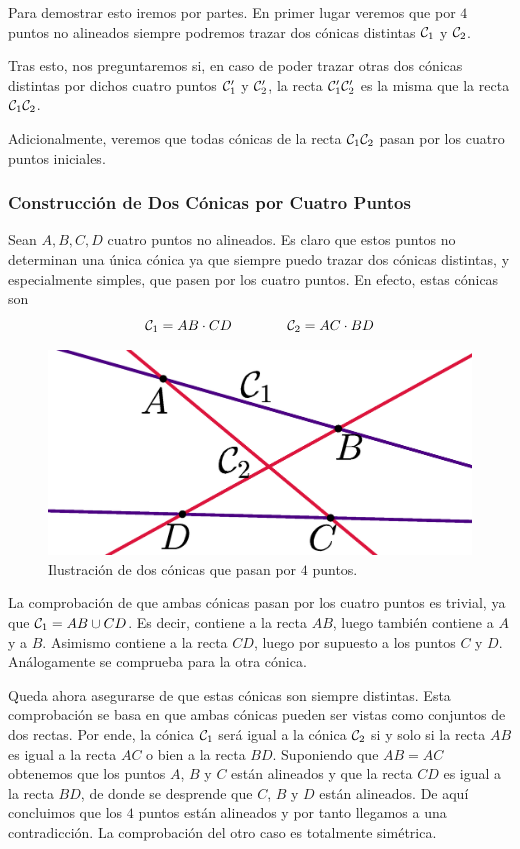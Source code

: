 Para demostrar esto iremos por partes. En primer lugar veremos que por $4$ puntos no alineados siempre podremos trazar dos cónicas distintas $\mathcal{C}_1$ y $\mathcal{C}_2$.

Tras esto, nos preguntaremos si, en caso de poder trazar otras dos cónicas distintas por dichos cuatro puntos $\mathcal{C}_1'$ y $\mathcal{C}_2'$, la recta $\mathcal{C}_1'\mathcal{C}_2'$ es la misma que la recta $\mathcal{C}_1\mathcal{C}_2$.

Adicionalmente, veremos que todas cónicas de la recta $\mathcal{C}_1\mathcal{C}_2$ pasan por los cuatro puntos iniciales.
\subsubsection{Construcción de Dos Cónicas por Cuatro Puntos}
Sean $A,B,C,D$ cuatro puntos no alineados. Es claro que estos puntos no determinan una única cónica ya que siempre puedo trazar dos cónicas distintas, y especialmente simples, que pasen por los cuatro puntos. En efecto, estas cónicas son
\begin{equation}
	\label{C8_eq_construccion}
	\mathcal{C}_1=AB\cdot CD\qquad\qquad\mathcal{C}_2=AC\cdot BD
\end{equation}
\begin{figure}[h]
	\centering
	\includegraphics[scale=.2]{Graficos/haz1.eps}
	\caption{Ilustración de dos cónicas que pasan por $4$ puntos.}
	\label{C8_img_haz1}
\end{figure}
La comprobación de que ambas cónicas pasan por los cuatro puntos es trivial, ya que $\mathcal{C}_1=AB\cup CD$. Es decir, contiene a la recta $AB$, luego también contiene a $A$ y a $B$. Asimismo contiene a la recta $CD$, luego por supuesto a los puntos $C$ y $D$. Análogamente se comprueba para la otra cónica.

Queda ahora asegurarse de que estas cónicas son siempre distintas. Esta comprobación se basa en que ambas cónicas pueden ser vistas como conjuntos de dos rectas. Por ende, la cónica $\mathcal{C}_1$ será igual a la cónica $\mathcal{C}_2$ si y solo si la recta $AB$ es igual a la recta $AC$ o bien a la recta $BD$. Suponiendo que $AB=AC$ obtenemos que los puntos $A$, $B$ y $C$ están alineados y que la recta $CD$ es igual a la recta $BD$, de donde se desprende que $C$, $B$ y $D$ están alineados. De aquí concluimos que los $4$ puntos están alineados y por tanto llegamos a una contradicción. La comprobación del otro caso es totalmente simétrica.
